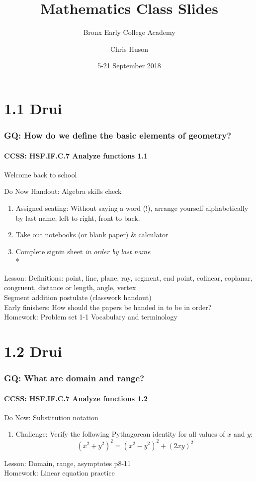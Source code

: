 \documentclass{beamer}
\title{Mathematics Class Slides}
\subtitle{Bronx Early College Academy}
\author{Chris Huson}
\date{5-21 September 2018}
\begin{document}
\frame{\titlepage}


  \section{1.1 Drui}
  \frame
  {
    \frametitle{GQ: How do we define the basic elements of geometry?}
    \framesubtitle{CCSS: HSF.IF.C.7 Analyze functions \qquad \qquad \qquad \alert{1.1}}
    Welcome back to school
    \begin{block}{Do Now Handout: Algebra skills check}
    \begin{enumerate}
        \item Assigned seating: \alert{Without saying a word (!),} arrange yourself alphabetically by last name, left to right, front to back.
        \item Take out notebooks (or blank paper) \& calculator
        \item Complete signin sheet \emph{in order by last name}\\*
    \end{enumerate}
    \end{block}
    Lesson: Definitions: point, line, plane, ray, segment, end point, colinear, coplanar, congruent, distance or length, angle, vertex \\%
    Segment addition postulate (classwork handout)\\
    Early finishers: How should the papers be handed in to be in order?\\
    Homework: Problem set 1-1 Vocabulary and terminology
  }

  \section{1.2 Drui}
  \frame
  {
    \frametitle{GQ: What are domain and range?}
    \framesubtitle{CCSS: HSF.IF.C.7 Analyze functions \qquad \qquad \qquad \qquad \alert{1.2}}

    \begin{block}{Do Now: Substitution notation}
    \begin{enumerate}
        \item Challenge: %
        Verify the following Pythagorean identity for all values of $x$ and $y$:
        \[(x^2+y^2)^2=(x^2-y^2)^2+(2xy)^2\]
    \end{enumerate}
    \end{block}
    Lesson: Domain, range, asymptotes p8-11
    \\%
    Homework: Linear equation practice
  }
\end{document}
